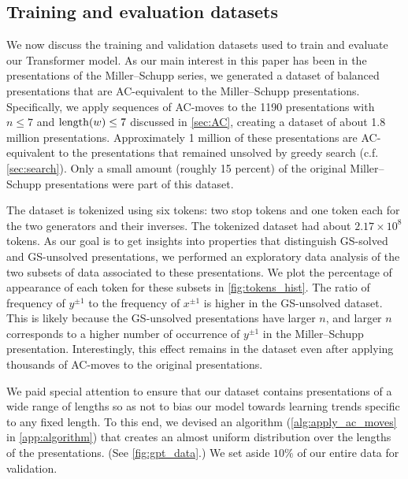 \subsection{Training and evaluation datasets\label{sec:transformer_datasets}}

We now discuss the training and validation datasets used to train and evaluate our Transformer model.
As our main interest in this paper has been in the presentations of the Miller--Schupp series, we generated a dataset of balanced presentations that are AC-equivalent to the Miller--Schupp presentations.
Specifically, we apply sequences of AC-moves to the 1190 presentations with $n \leq 7$ and $\operatorname{length}(w) \leq 7$ discussed in \autoref{sec:AC}, creating a dataset of about 1.8 million presentations.
Approximately 1 million of these presentations are AC-equivalent to the presentations that remained unsolved by greedy search (c.f. \autoref{sec:search}).
Only a small amount (roughly 15 percent) of the original Miller--Schupp presentations were part of this dataset.

The dataset is tokenized using six tokens: two stop tokens and one token each for the two generators and their inverses.
The tokenized dataset had about $2.17 \times 10^8$ tokens.
As our goal is to get insights into properties that distinguish GS-solved and GS-unsolved presentations, we performed an exploratory data analysis of the two subsets of data associated to these presentations.
We plot the percentage of appearance of each token for these subsets in \autoref{fig:tokens_hist}.
The ratio of frequency of $y^{\pm 1}$ to the frequency of $x^{\pm 1}$ is higher in the GS-unsolved dataset.
This is likely because the GS-unsolved presentations have larger $n$, and larger $n$ corresponds to a higher number of occurrence of $y^{\pm 1}$ in the Miller--Schupp presentation.
Interestingly, this effect remains in the dataset even after applying thousands of AC-moves to the original presentations.

We paid special attention to ensure that our dataset contains presentations of a wide range of lengths so as not to bias our model towards learning trends specific to any fixed length.
To this end, we devised an algorithm (\autoref{alg:apply_ac_moves} in \autoref{app:algorithm}) that creates an almost uniform distribution over the lengths of the presentations.
(See \autoref{fig:gpt_data}.) We set aside $10\%$ of our entire data for validation.

